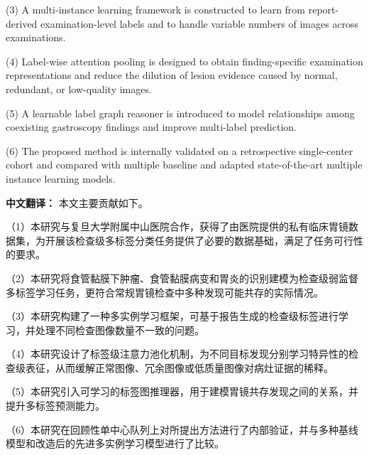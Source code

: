 \documentclass[Afour,sagev,times]{sagej}
\begin{document}
(3) A multi-instance learning framework is constructed to learn from report-derived examination-level labels and to handle variable numbers of images across examinations.

(4) Label-wise attention pooling is designed to obtain finding-specific examination representations and reduce the dilution of lesion evidence caused by normal, redundant, or low-quality images.

(5) A learnable label graph reasoner is introduced to model relationships among coexisting gastroscopy findings and improve multi-label prediction.

(6) The proposed method is internally validated on a retrospective single-center cohort and compared with multiple baseline and adapted state-of-the-art multiple instance learning models.\cite{R8,R9,R10,R11}

\textbf{中文翻译：} 本文主要贡献如下。

（1）本研究与复旦大学附属中山医院合作，获得了由医院提供的私有临床胃镜数据集，为开展该检查级多标签分类任务提供了必要的数据基础，满足了任务可行性的要求。

（2）本研究将食管黏膜下肿瘤、食管黏膜病变和胃炎的识别建模为检查级弱监督多标签学习任务，更符合常规胃镜检查中多种发现可能共存的实际情况。

（3）本研究构建了一种多实例学习框架，可基于报告生成的检查级标签进行学习，并处理不同检查图像数量不一致的问题。

（4）本研究设计了标签级注意力池化机制，为不同目标发现分别学习特异性的检查级表征，从而缓解正常图像、冗余图像或低质量图像对病灶证据的稀释。

（5）本研究引入可学习的标签图推理器，用于建模胃镜共存发现之间的关系，并提升多标签预测能力。

（6）本研究在回顾性单中心队列上对所提出方法进行了内部验证，并与多种基线模型和改造后的先进多实例学习模型进行了比较。
\end{document}
